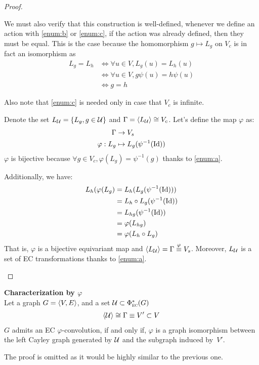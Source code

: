 \begin{proof}
\begin{enumerate}
We must also verify that this construction is well-defined, \ie whenever we define an action with \ref{enum:b} or \ref{enum:c}, if the action was already defined, then they must be equal. This is the case because the homomorphism $g \mapsto L_g$ on $V_c$ is in fact an isomorphism as
\begin{align*}
L_g = L_h & \Leftrightarrow \forall u \in V, L_g(u) = L_h(u)\\
 & \Leftrightarrow \forall u \in V, g\psi(u) = h\psi(u)\\
 & \Leftrightarrow g = h
\end{align*}

Also note that \ref{enum:c} is needed only in case that $V_c$ is infinite.

Denote the set $L_{\mathcal{U}} = \{L_g, g \in \mathcal{U} \}$ and $\Gamma = \langle L_{\mathcal{U}} \rangle \cong V_c$. Let's define the map $\varphi$ as:
\begin{align*}
\Gamma & \rightarrow V_s\\
\varphi: L_g & \mapsto L_g(\psi^{-1}(\operatorname{Id}))
\end{align*}
$\varphi$ is bijective because $\forall g \in V_c, \varphi(L_g) = \psi^{-1}(g)$ thanks to \ref{enum:a}.

Additionally, we have:
\begin{align*}
L_h(\varphi(L_g) & = L_h(L_g(\psi^{-1}(\operatorname{Id})))\\
 & = L_h \circ L_g(\psi^{-1}(\operatorname{Id}))\\
 & = L_{hg}(\psi^{-1}(\operatorname{Id}))\\
 & = \varphi(L_{hg})\\
 & = \varphi(L_h \circ L_g)
\end{align*}
That is, $\varphi$ is a bijective equivariant map and $ \langle L_{\mathcal{U}} \rangle = \Gamma \overset{\varphi}{\equiv} V_s$. Moreover, $L_{\mathcal{U}}$ is a set of EC transformations thanks to \ref{enum:a}.%
\end{enumerate}
\end{proof}

\begin{corollary}\textbf{Characterization by $\varphi$}\\
Let a graph $G = \langle V, E \rangle$, and a set $\mathcal{U} \subset \Phi^*_{\operatorname{\textsc{ec}}}(G)$ \st
\begin{gather*}
\langle \mathcal{U} \rangle \cong \Gamma \equiv V' \subset V
\end{gather*}
$G$ admits an EC $\varphi$-convolution, if and only if, $\varphi$ is a graph isomorphism between the left Cayley graph generated by $\mathcal{U}$ and the subgraph induced by~$V'$.
\label{cor:cayley}
\end{corollary}
The proof is omitted as it would be highly similar to the previous one.


